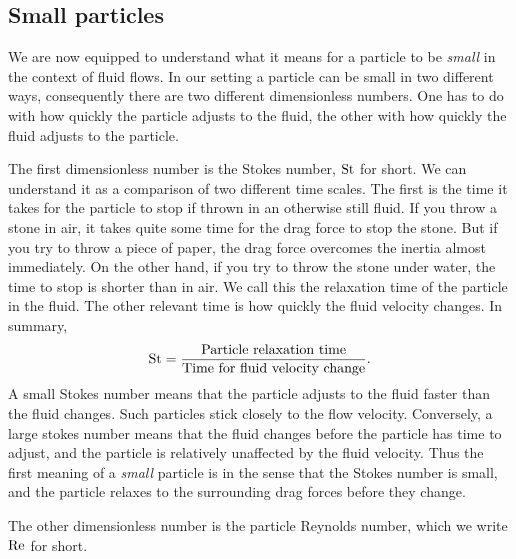 \documentclass[thesis.tex]{subfiles}
\begin{document}
\subsection{Small particles}

We are now equipped to understand what it means for a particle to be \emph{small} in the context of fluid flows. In our setting a particle can be small in two different ways, consequently there are two different dimensionless numbers. One has to do with how quickly the particle adjusts to the fluid, the other with how quickly the fluid adjusts to the particle.

The first dimensionless number is the Stokes number, $\mbox{St}$ for short. We can understand it as a comparison of two different time scales. The first is the time it takes for the particle to stop if thrown in an otherwise still fluid. If you throw a stone in air, it takes quite some time for the drag force to stop the stone. But if you try to throw a piece of paper, the drag force overcomes the inertia almost immediately. On the other hand, if you try to throw the stone under water, the time to stop is shorter than in air. We call this the relaxation time of the particle in the fluid. The other relevant time is how quickly the fluid velocity changes. In summary, 
\begin{align*}
 	\mbox{St} = \frac{\textrm{Particle relaxation time}}{\textrm{Time for fluid velocity change}}.
 \end{align*} 
A small Stokes number means that the particle adjusts to the fluid faster than the fluid changes. Such particles stick closely to the flow velocity. Conversely, a large stokes number means that the fluid changes before the particle has time to adjust, and the particle is relatively unaffected by the fluid velocity. Thus the first meaning of a \emph{small} particle is in the sense that the Stokes number is small, and the particle relaxes to the surrounding drag forces before they change.

The other dimensionless number is the particle Reynolds number, which we write $\mbox{Re}$ for short.
\end{document}
